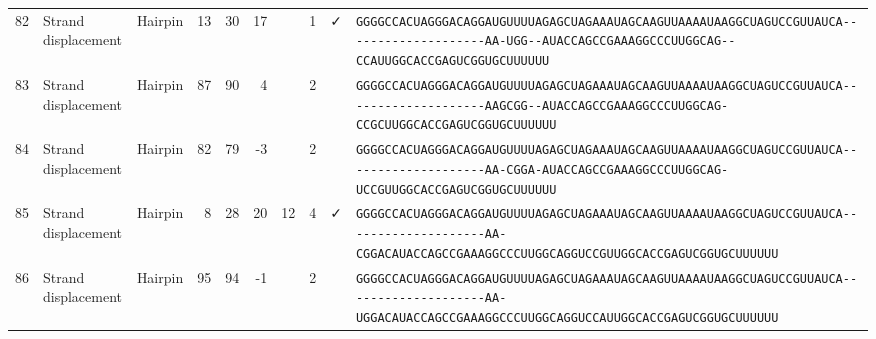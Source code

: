 \begin{tabular}{rllrrrrrcl}
 82 & Strand displacement & Hairpin & 13 & 30 & 17 &  & 1 & ✓ &
 \color{ucsfdarkgrey}\verb|GGGGCCACUAGGGACAGGAU|\color{ucsforange}\verb|GUUUUA|\color{ucsfblue}\verb|GAGCUAGAAAUAGCAAGU|\color{ucsforange}\verb|UAAAAUAA|\color{ucsfnavy}\verb|GGCUAGUCCGU|\color{ucsforange}\verb|UAUCA|\color{ucsfteal}\verb|--------------------AA-UGG--|\color{ucsfpurple}\verb|AUACCAGCCGAAAGGCCCUUGGCAG|\color{ucsfteal}\verb|--CCAUU|\color{ucsforange}\verb|GGCACCGAGUCGGUGCUUUUUU| \\

 83 & Strand displacement & Hairpin & 87 & 90 & 4 &   & 2 &  &
 \color{ucsfdarkgrey}\verb|GGGGCCACUAGGGACAGGAU|\color{ucsforange}\verb|GUUUUA|\color{ucsfblue}\verb|GAGCUAGAAAUAGCAAGU|\color{ucsforange}\verb|UAAAAUAA|\color{ucsfnavy}\verb|GGCUAGUCCGU|\color{ucsforange}\verb|UAUCA|\color{ucsfteal}\verb|--------------------AAGCGG--|\color{ucsfpurple}\verb|AUACCAGCCGAAAGGCCCUUGGCAG|\color{ucsfteal}\verb|-CCGCUU|\color{ucsforange}\verb|GGCACCGAGUCGGUGCUUUUUU| \\

 84 & Strand displacement & Hairpin & 82 & 79 & -3 &   & 2 &  &
 \color{ucsfdarkgrey}\verb|GGGGCCACUAGGGACAGGAU|\color{ucsforange}\verb|GUUUUA|\color{ucsfblue}\verb|GAGCUAGAAAUAGCAAGU|\color{ucsforange}\verb|UAAAAUAA|\color{ucsfnavy}\verb|GGCUAGUCCGU|\color{ucsforange}\verb|UAUCA|\color{ucsfteal}\verb|--------------------AA-CGGA-|\color{ucsfpurple}\verb|AUACCAGCCGAAAGGCCCUUGGCAG|\color{ucsfteal}\verb|-UCCGUU|\color{ucsforange}\verb|GGCACCGAGUCGGUGCUUUUUU| \\

 85 & Strand displacement & Hairpin & 8 & 28 & 20 & 12 & 4 & ✓ &
 \color{ucsfdarkgrey}\verb|GGGGCCACUAGGGACAGGAU|\color{ucsforange}\verb|GUUUUA|\color{ucsfblue}\verb|GAGCUAGAAAUAGCAAGU|\color{ucsforange}\verb|UAAAAUAA|\color{ucsfnavy}\verb|GGCUAGUCCGU|\color{ucsforange}\verb|UAUCA|\color{ucsfteal}\verb|--------------------AA-CGGAC|\color{ucsfpurple}\verb|AUACCAGCCGAAAGGCCCUUGGCAG|\color{ucsfteal}\verb|GUCCGUU|\color{ucsforange}\verb|GGCACCGAGUCGGUGCUUUUUU| \\

 86 & Strand displacement & Hairpin & 95 & 94 & -1 &   & 2 &  &
 \color{ucsfdarkgrey}\verb|GGGGCCACUAGGGACAGGAU|\color{ucsforange}\verb|GUUUUA|\color{ucsfblue}\verb|GAGCUAGAAAUAGCAAGU|\color{ucsforange}\verb|UAAAAUAA|\color{ucsfnavy}\verb|GGCUAGUCCGU|\color{ucsforange}\verb|UAUCA|\color{ucsfteal}\verb|--------------------AA-UGGAC|\color{ucsfpurple}\verb|AUACCAGCCGAAAGGCCCUUGGCAG|\color{ucsfteal}\verb|GUCCAUU|\color{ucsforange}\verb|GGCACCGAGUCGGUGCUUUUUU| \\

\bottomrule
\end{tabular}

